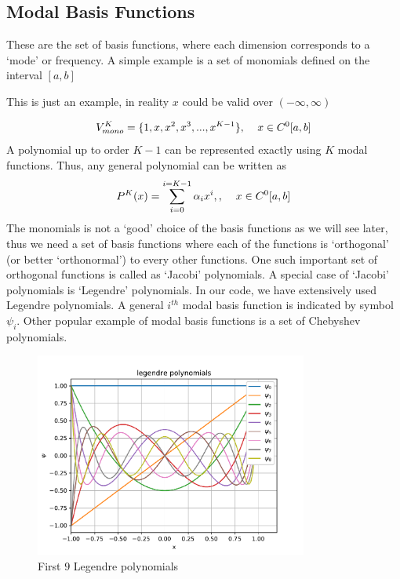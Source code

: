 \subsection{Modal Basis Functions}
These are the set of basis functions, where each dimension corresponds to a `mode' or frequency. A simple example is 
a set of monomials defined on the interval $[a,b]$ 
\begin{note}
This is just an example, in reality $x$ could be valid over $(-\infty, \infty)$ 
\end{note}
\begin{equation}
	V_{mono}^K = \{1, x, x^2, x^3, ..., x^{K-1}\} ,\hspace{4mm} x\in C^0[a,b]
\end{equation}
A polynomial up to order $K-1$ can be represented exactly using $K$ modal functions. 
Thus, any general polynomial can be written as
\begin{equation}
	P^K(x) = \sum_{i=0}^{i=K-1} \alpha_{i} x^{i}, ,\hspace{4mm} x\in C^0[a,b]
\end{equation}
The monomials is not a `good' choice of the basis functions as we will see later, thus we need a set of basis functions
where each of the functions is `orthogonal' (or better `orthonormal') to every other functions. 
One such important set of orthogonal functions 
is called as `Jacobi' polynomials. A special case of `Jacobi' polynomials is `Legendre' polynomials.
In our code, we have extensively used Legendre polynomials. 
A general $i^{th}$  modal basis function is indicated by symbol $\psi_i$.
Other popular example of modal basis functions is a set of Chebyshev polynomials.
\begin{figure}[H]
	\begin{center}
		\includegraphics[width=0.8\textwidth]{Legendre.pdf}
		\caption{\label{Legendre} First $9$ Legendre polynomials}
	\end{center}
\end{figure}
